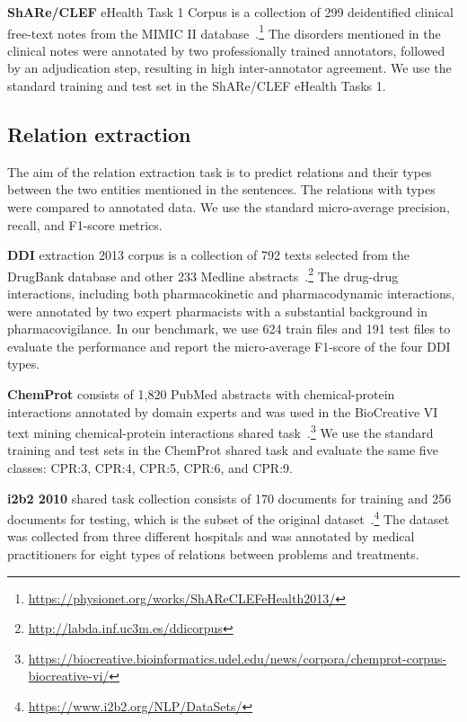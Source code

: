 \documentclass[11pt,a4paper]{article}
\begin{document}
\textbf{ShARe/CLEF} eHealth Task 1 Corpus is a collection of 299 deidentified clinical free-text notes from the MIMIC II database~\cite{suominen2013overview}.\footnote{\url{https://physionet.org/works/ShAReCLEFeHealth2013/}} The disorders mentioned in the clinical notes were annotated by two professionally trained annotators, followed by an adjudication step, resulting in high inter-annotator agreement. We use the standard training and test set in the ShARe/CLEF eHealth Tasks 1.

\subsection{Relation extraction}

The aim of the relation extraction task is to predict relations and their types between the two entities mentioned in the sentences. The relations with types were compared to annotated data. We use the standard micro-average precision, recall, and F1-score metrics.

\textbf{DDI} extraction 2013 corpus is a collection of 792 texts selected from the DrugBank database and other 233 Medline abstracts~\cite{herrero-zazo2013ddi}.\footnote{\url{http://labda.inf.uc3m.es/ddicorpus}} The drug-drug interactions, including both pharmacokinetic and pharmacodynamic interactions, were annotated by two expert pharmacists with a substantial background in pharmacovigilance. In our benchmark, we use 624 train files and 191 test files to evaluate the performance and report the micro-average F1-score of the four DDI types.

\textbf{ChemProt} consists of 1,820 PubMed abstracts with chemical-protein interactions annotated by domain experts and was used in the BioCreative VI text mining chemical-protein interactions shared task~\cite{krallinger2017overview}.\footnote{\url{https://biocreative.bioinformatics.udel.edu/news/corpora/chemprot-corpus-biocreative-vi/}} We use the standard training and test sets in the ChemProt shared task and evaluate the same five classes: CPR:3, CPR:4, CPR:5, CPR:6, and CPR:9.

\textbf{i2b2 2010} shared task collection consists of 170 documents for training and 256 documents for testing, which is the subset of the original dataset~\cite{uzuner20112010}.\footnote{\url{https://www.i2b2.org/NLP/DataSets/}} The dataset was collected from three different hospitals and was annotated by medical practitioners for eight types of relations between problems and treatments.
\end{document}
